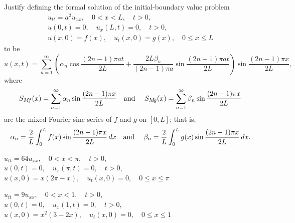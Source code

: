 \begin{exerciselist}
  \item\label{exer:12.2.34} Justify defining the formal solution of the initial-boundary value
        problem
  \[
    \begin{array}{c}
      u_{tt}=a^{2}u_{xx},\quad0<x<L,\quad t>0,           \\
      u(0,t)=0,\quad u_{x}(L,t)=0,\quad t>0,             \\
      u(x,0)=f(x),\quad u_{t}(x,0)=g(x),\quad0\le x\le L
    \end{array}
  \]
  to be
  \[
    u(x,t)=\sum_{n=1}^{\infty}\left(\alpha_{n}\cos\frac{(2n-1)\pi a t}{2L}+\frac{2L\beta_{n}}{(2n-1)\pi a}\sin\frac{(2n-1)\pi at}{2L}\right) \sin\frac{(2n-1)\pi x}{2L},
  \]
  where
  \[
    S_{M\!f}(x)=\sum_{n=1}^{\infty}\alpha_{n}\sin\frac{(2n-1)\pi x}{2L}\mbox{\quad and \quad}S_{M\!g}(x)=\sum_{n=1}^{\infty}\beta_{n}\sin\frac{(2n-1)\pi x}{2L}
  \]
  are the mixed Fourier sine series of $f$ and $g$ on $[0,L]$; that is,
  \[
    \alpha_{n}=\frac{2}{L}\int_{0}^{L}f(x)\sin\frac{(2n-1)\pi x}{2L}\,dx \mbox{\quad and \quad}\beta_{n}=\frac{2}{L}\int_{0}^{L}g(x)\sin\frac{(2n-1)\pi x}{2L}\,dx.
  \]


  \item\label{exer:12.2.35} $u_{tt}=64u_{xx},\quad0<x<\pi,\quad t>0$,\\ $u(0,t)=0,\quad u_{x}(\pi,t)=0,\quad t>0$,\\ $u(x,0)=x(2\pi-x),\quad u_{t}(x,0)=0,\quad0\le x\le\pi$

  \item\label{exer:12.2.36} $u_{tt}=9u_{xx},\quad0<x<1,\quad t>0$,\\ $u(0,t)=0,\quad u_{x}(1,t)=0,\quad t>0$,\\ $u(x,0)=x^{2}(3-2x),\quad u_{t}(x,0)=0,\quad0\le x\le1$


\end{exerciselist}
